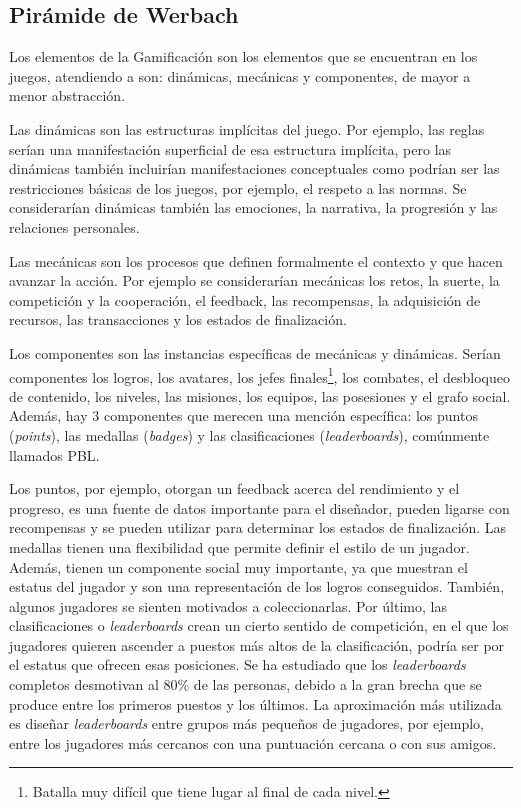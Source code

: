 \subsection{Pirámide de Werbach}

Los elementos de la Gamificación son los elementos que se encuentran en los juegos, atendiendo a  \cite{werbach2012win} son: dinámicas, mecánicas y componentes, de mayor a menor abstracción.

%
Las dinámicas son las estructuras implícitas del juego. 
%
Por ejemplo, las reglas serían una manifestación superficial de esa estructura implícita, pero las dinámicas también incluirían manifestaciones conceptuales como podrían ser las restricciones básicas de los juegos, por ejemplo, el respeto a las normas.
%
Se considerarían dinámicas también las emociones, la narrativa, la progresión y las relaciones personales. 

 Las mecánicas son los procesos que definen formalmente el contexto y que hacen avanzar la acción. 
%
Por ejemplo se considerarían mecánicas los retos, la suerte, la competición y la cooperación, el feedback, las recompensas, la adquisición de recursos, las transacciones y los estados de finalización.

 Los componentes son las instancias específicas de mecánicas y dinámicas. 
%
Serían componentes los logros, los avatares, los jefes finales\footnote{Batalla muy difícil que tiene lugar al final de cada nivel.}, los combates, el desbloqueo de contenido, los niveles, las misiones, los equipos, las posesiones y el grafo social.
%
Además, hay 3 componentes que merecen una mención específica: los puntos (\textit{points}), las medallas (\textit{badges}) y las clasificaciones (\textit{leaderboards}), comúnmente llamados \gls{PBL}.

Los puntos, por ejemplo, otorgan un feedback acerca del rendimiento y el progreso, es una fuente de datos importante para el diseñador, pueden ligarse con recompensas y se pueden utilizar para determinar los estados de finalización.
%
Las medallas tienen una flexibilidad que permite definir el estilo de un jugador. 
%
Además, tienen un componente social muy importante, ya que muestran el estatus del jugador y son una representación de los logros conseguidos. 
%
También, algunos jugadores se sienten motivados a coleccionarlas.
%
Por último, las clasificaciones o \textit{leaderboards} crean un cierto sentido de competición, en el que los jugadores quieren ascender a puestos más altos de la clasificación, podría ser por el estatus que ofrecen esas posiciones.
%
Se ha estudiado que los \textit{leaderboards} completos desmotivan al 80\% de las personas, debido a la gran brecha que se produce entre los primeros puestos y los últimos.
%
La aproximación más utilizada es diseñar \textit{leaderboards} entre grupos más pequeños de jugadores, por ejemplo, entre los jugadores más cercanos con una puntuación cercana o con sus amigos.



